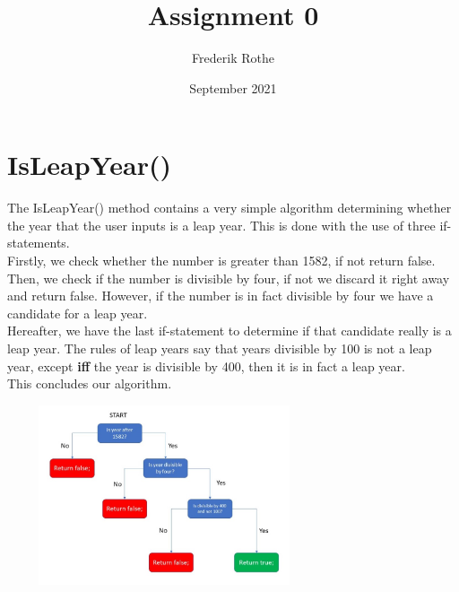 \documentclass{article}
\title{Assignment 0}
\author{Frederik Rothe}
\date{September 2021}
\begin{document}
\maketitle

\section*{IsLeapYear()}

The IsLeapYear() method contains a very simple algorithm determining whether the year that the user inputs is a leap year. 
This is done with the use of three if-statements. \\
Firstly, we check whether the number is greater than 1582, if not return false.
Then, we check if the number is divisible by four, if not we discard it right away and return false. However, if the number is in fact divisible by four we have a candidate for a leap year. \\
Hereafter, we have the last if-statement to determine if that candidate really is a leap year. The rules of leap years say that years divisible by 100 is not a leap year, except \textbf{iff} the year is divisible by 400, then it is in fact a leap year. \\
This concludes our algorithm.
\begin{center}
\includegraphics[width=350, height=200]{IsLeapYearDiagram.jpg}    
\end{center}
\end{document}
